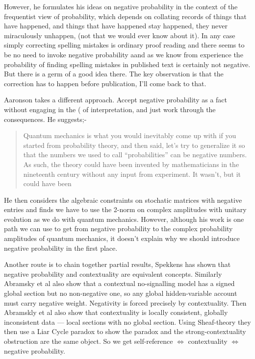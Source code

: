 \documentclass{article}
\begin{document}
However, he formulates his ideas on negative probability in the context of the frequentist view of probability, which depends  on collating records of things that have happened, and things that have happened stay happened, they never miraculously unhappen, (not that we would ever know about it). In any case simply correcting spelling mistakes is ordinary proof reading and there seems to be no need to invoke negative probability aand as we know from experience the probability of finding spelling mistakes in published text is certainly not negative. But there is a germ of a good idea there. The key observation is that the correction has to happen before publication, I'll come back to that. 

Aaronson \autocite{aaronson_lect9, Aaronson:dem} takes a different approach. Accept negative probability as a fact without engaging in  the (\autocite{Cardano_1545} of interpretation, and just work through the consequences. He suggests;-
\begin{quotation}
    Quantum mechanics is what you would inevitably come up with if you started from probability theory, and then said, let's try to generalize it so that the numbers we used to call “probabilities” can be negative numbers. As such, the theory could have been invented by mathematicians in the nineteenth century without any input from experiment. It wasn't, but it could have been
     \par
  \hfill \autocite{Aaronson:dem}
\end{quotation}
He then considers the algebraic constraints on stochatic matrices with negative entries and finds we have to use the 2-norm on complex amplitudes with unitary evolution as we do with quantum mechanics.
However, although his work is one path we can use to get from negative probability to the complex probability amplitudes of quantum mechanics, it doesn't explain why we should introduce negative probability in the first place. 

Another route is to chain together partial results, Spekkens \autocite{spekkens_contextuality_2007} has shown that negative probability and contextuality are equivalent concepts. Similarly Abramsky et al \autocite{Abramsky2014} also show that a contextual no-signalling model has a signed global section but no non-negative one, so any global hidden-variable account must carry negative weight. Negativity is forced precisely by contextuality. Then Abramskly et al \autocite{Abramsky2015} also show that contextuality is locally consistent, globally inconsistent data — local sections with no global section. Using Sheaf-theory they then use a Liar Cycle paradox to show the paradox and the strong-contextuality obstruction are the same object. So we get self-reference  $\iff$ contextuality $\iff$ negative probability.
\end{document}
